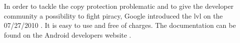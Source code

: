 In order to tackle the copy protection problematic and to give the developer community a possibility to fight piracy, Google introduced the \gls{lvl} on the 07/27/2010 \cite{developersLicensingBlog}.
It is easy to use and free of charges.
The documentation can be found on the Android developers website \cite{developersLicensingOverview}. 
